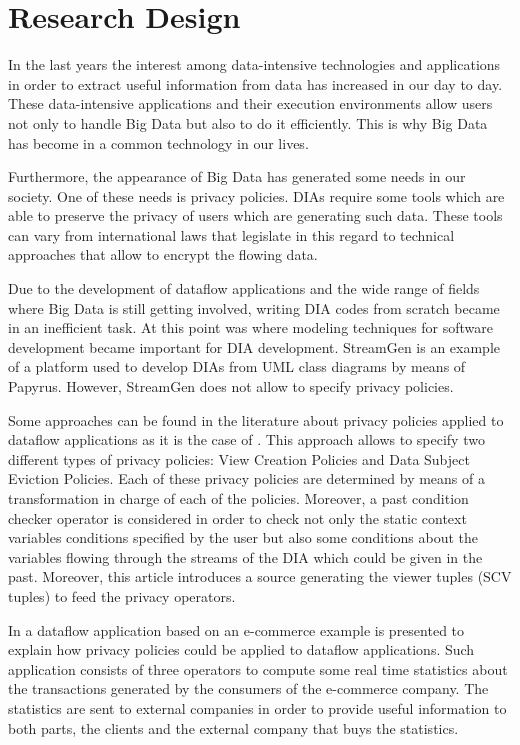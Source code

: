 \chapter[Research Design]{Research Design}
\label{sec:chapter3}

In the last years the interest among data-intensive technologies and applications in order to extract useful information from data has increased in our day to day. These data-intensive applications and their execution environments allow users not only to handle Big Data but also to do it efficiently. This is why Big Data has become in a common technology in our lives.

Furthermore, the appearance of Big Data has generated some needs in our society. One of these needs is privacy policies. DIAs require some tools which are able to preserve the privacy of users which are generating such data. These tools can vary from international laws that legislate in this regard to technical approaches that allow to encrypt the flowing data.

Due to the development of dataflow applications and the wide range of fields where Big Data is still getting involved, writing DIA codes from scratch became in an inefficient task. At this point was where modeling techniques for software development became important for DIA development. StreamGen is an example of a platform used to develop DIAs from UML class diagrams by means of Papyrus. However, StreamGen does not allow to specify privacy policies.

Some approaches can be found in the literature about privacy policies applied to dataflow applications as it is the case of \cite{privacypoliciesarticle}. This approach allows to specify two different types of privacy policies: View Creation Policies and Data Subject Eviction Policies. Each of these privacy policies are determined by means of a transformation in charge of each of the policies. Moreover, a past condition checker operator is considered in order to check not only the static context variables conditions specified by the user but also some conditions about the variables flowing through the streams of the DIA which could be given in the past. Moreover, this article introduces a source generating the viewer tuples (SCV tuples) to feed the privacy operators.

In \cite{privacypoliciesarticle} a dataflow application based on an e-commerce example is presented to explain how privacy policies could be applied to dataflow applications. Such application consists of three operators to compute some real time statistics about the transactions generated by the consumers of the e-commerce company. The statistics are sent to external companies in order to provide useful information to both parts, the clients and the external company that buys the statistics.

